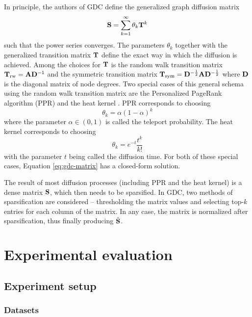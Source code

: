 \documentclass[sn-mathphys,pdflatex,iicol]{sn-jnl}%
\newcommand{\mathmat}{\ensuremath{\mathbf}}
\begin{document}
In principle, the authors of GDC define the generalized graph diffusion matrix
\begin{equation}\label{eq:gdc-matrix}
    \mathmat{S} = \sum_{k = 1}^\infty \theta_k \mathmat{T}^k
\end{equation}
such that the power series converges. The parameters \( \theta_k \) together with the generalized transition matrix \( \mathmat{T} \) define the exact way in which the diffusion is achieved. Among the choices for \( \mathmat{T} \) is the random walk transition matrix \( \mathmat{T}_ \mathrm{rw} = \mathmat{A} \mathmat{D}^{-1} \) and the symmetric transition matrix \( \mathmat{T}_\mathrm{sym} = \mathmat{D}^{-\frac{1}{2}} \mathmat{A} \mathmat{D}^{-\frac{1}{2}} \) where \( \mathmat{D} \) is the diagonal matrix of node degrees. Two special cases of this general schema using the random walk transition matrix are the Personalized PageRank algorithm (PPR) \cite{page_pagerank_1999} and the heat kernel \cite{kondor_diffusion_2002}. PPR corresponds to choosing
\[ \theta_k = \alpha \left( 1 - \alpha \right)^k \]
where the parameter \( \alpha \in \left( 0, 1 \right) \) is called the teleport probability. The heat kernel corresponds to choosing
\[ \theta_k = e^{-t} \frac{t^k}{k!} \]
with the parameter \( t \) being called the diffusion time. For both of these special cases, Equation \ref{eq:gdc-matrix} has a closed-form solution.

The result of most diffusion processes (including PPR and the heat kernel) is a dense matrix \( \mathmat{S} \), which then needs to be sparsified. In GDC, two methods of sparsification are considered -- thresholding the matrix values and selecting top-\( k \) entries for each column of the matrix. In any case, the matrix is normalized after sparsification, thus finally producing \( \hat{\mathmat{S}} \).

\section{Experimental evaluation}\label{sec:experimental-evaluation}

\subsection{Experiment setup}

\subsubsection{Datasets}
\end{document}

